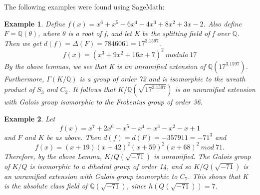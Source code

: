 \documentclass[preprint,12pt,reqno]{elsarticle}
\newtheorem{example}{Example}
\begin{document}
The following examples were found using SageMath:
\begin{example}
Define $f(x)=x^6 + x^5 - 6x^4 - 4x^3 + 8x^2 + 3x - 2$. Also define $F=\mathbb{Q}(\theta)$, where $\theta$ is a root of f, and let K be the splitting field of f over $\mathbb{Q}$. Then we get $d(f)=\Delta(F)=7846061=17^3.1597$. \begin{equation}
   f(x)= (x^3 + 9x^2 + 16x + 7)^2\:modulo\:17
\end{equation}
By the above lemmas, we see that K is an unramified extension of $\mathbb{Q}(17^3.1597)$. Furthermore, $\Gamma(K/\mathbb{Q})$ is a group of order 72 and is isomorphic to the wreath product of $S_3$ and $C_2$. It follows that $K/\mathbb{Q}(\sqrt{17^3.1597})$ is an unramified extension with Galois group isomorphic to the Frobenius group of order 36.
\end{example}
\begin{example}
 Let \begin{equation}
     f(x)=x^7 + 2x^6 - x^5 - x^4 + x^3 - x^2 - x + 1
 \end{equation}and $F$ and $K$ be as above.
Then $d(f)=d(F)=-357911=-71^{3}$ and
\begin{equation}
    f(x)=(x + 19)(x + 42)^2 (x + 59)^2(x + 68)^2\:mod\:71.
\end{equation}
Therefore, by the above Lemma, $K/Q(\sqrt{-71})$ is unramified. The Galois group of $K/Q$
is isomorphic to a dihedral group of order 14, and so $K/Q(\sqrt{-71})$
is an unramified extension with Galois group isomorphic to $C_7$.
This shows that K is the absolute class field of $\mathbb{Q}(\sqrt{-71})$, since $h(Q(\sqrt{-71}))=7$.
\end{example}
\end{document}
